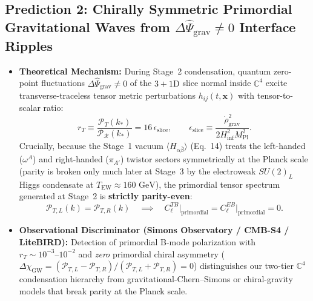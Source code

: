 \documentclass[11pt,a4paper]{article}
\begin{document}
\subsection{Prediction 2: Chirally Symmetric Primordial Gravitational Waves from \texorpdfstring{$\Delta\hat{\Psi}_{\text{grav}} \neq 0$}{Delta Psi\_grav != 0} Interface Ripples}
\begin{itemize}
    \item \textbf{Theoretical Mechanism:} During Stage~2 condensation, quantum zero-point fluctuations $\Delta\hat{\Psi}_{\text{grav}} \neq 0$ of the $3+1\text{D}$ slice normal inside $\mathbb{C}^4$ excite transverse-traceless tensor metric perturbations $h_{ij}(t, \mathbf{x})$ with tensor-to-scalar ratio:
    \begin{equation}
    r_T \equiv \frac{\mathcal{P}_T(k_*)}{\mathcal{P}_{\mathcal{R}}(k_*)} = 16\,\epsilon_{\text{slice}}, \qquad \epsilon_{\text{slice}} \equiv \frac{\dot{\rho}_{\text{grav}}^2}{2 H_{\text{inf}}^2 M_{\text{Pl}}^2}.
    \end{equation}
    Crucially, because the Stage~1 vacuum $\langle H_{\alpha\bar{\beta}}\rangle$ (Eq.\ 14) treats the left-handed ($\omega^A$) and right-handed ($\pi_{A'}$) twistor sectors symmetrically at the Planck scale (parity is broken only much later at Stage~3 by the electroweak $SU(2)_L$ Higgs condensate at $T_{\text{EW}} \approx 160\text{ GeV}$), the primordial tensor spectrum generated at Stage~2 is \textbf{strictly parity-even}:
    \begin{equation}
    \mathcal{P}_{T,L}(k) = \mathcal{P}_{T,R}(k) \quad \implies \quad C_\ell^{TB}\big|_{\text{primordial}} = C_\ell^{EB}\big|_{\text{primordial}} = 0.
    \end{equation}
    \item \textbf{Observational Discriminator (Simons Observatory / CMB-S4 / LiteBIRD):} Detection of primordial B-mode polarization with $r_T \sim 10^{-3}\text{--}10^{-2}$ and \emph{zero} primordial chiral asymmetry ($\Delta\chi_{\text{GW}} = (\mathcal{P}_{T,L} - \mathcal{P}_{T,R})/(\mathcal{P}_{T,L} + \mathcal{P}_{T,R}) = 0$) distinguishes our two-tier $\mathbb{C}^4$ condensation hierarchy from gravitational-Chern--Simons or chiral-gravity models that break parity at the Planck scale.
\end{itemize}
\end{document}
